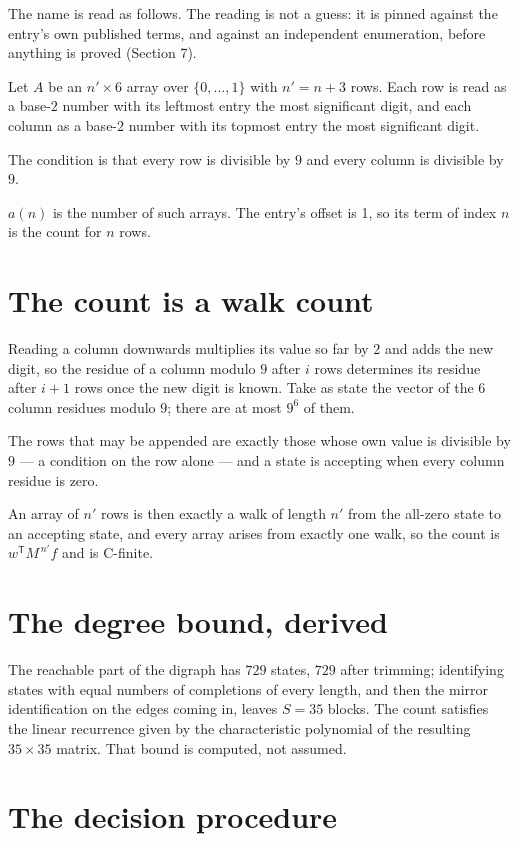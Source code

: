 \documentclass[11pt]{article}
\theoremstyle{definition}
\begin{document}
The name is read as follows. The reading is not a guess: it is pinned against the entry's own published terms, and against an independent enumeration, before anything is proved (Section 7).

Let $A$ be an $n' \times 6$ array over $\{0,\dots,1\}$ with $n' = n + 3$ rows. Each row is read as a base-$2$ number with its leftmost entry the most significant digit, and each column as a base-$2$ number with its topmost entry the most significant digit.

The condition is that every row is divisible by $9$ and every column is divisible by $9$.

$a(n)$ is the number of such arrays. The entry's offset is 1, so its term of index $n$ is the count for $n$ rows.

\section{The count is a walk count}

Reading a column downwards multiplies its value so far by $2$ and adds the new digit, so the residue of a column modulo $9$ after $i$ rows determines its residue after $i+1$ rows once the new digit is known. Take as state the vector of the $6$ column residues modulo $9$; there are at most $9^{6}$ of them.

The rows that may be appended are exactly those whose own value is divisible by $9$ --- a condition on the row alone --- and a state is accepting when every column residue is zero.

An array of $n'$ rows is then exactly a walk of length $n'$ from the all-zero state to an accepting state, and every array arises from exactly one walk, so the count is $w^{\mathsf T}M^{\,n'}f$ and is C-finite.

\section{The degree bound, derived}

The reachable part of the digraph has $729$ states, $729$ after trimming; identifying states with equal numbers of completions of every length, and then the mirror identification on the edges coming in, leaves $S = 35$ blocks. The count satisfies the linear recurrence given by the characteristic polynomial of the resulting $35\times35$ matrix. That bound is computed, not assumed.

\section{The decision procedure}
\end{document}
